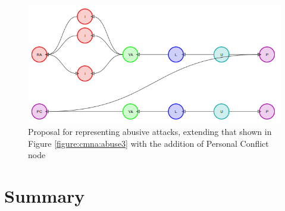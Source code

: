 \begin{figure}
\centering
\includegraphics[scale=0.5]{./figures/graphs/aswo-personal-conflict.png}
\caption{Proposal for representing abusive attacks, extending that shown in Figure \ref{figure:cmna:abuse3} with the addition of Personal Conflict node}
\label{figure:cmna:abuse4}
\end{figure}

\section{Summary}
